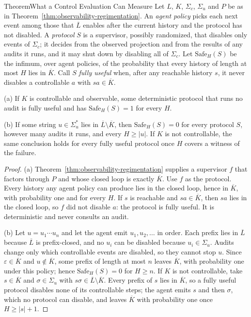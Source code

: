 \begin{pdclaim}{Theorem}{What a Control Evaluation Can Measure}\label{thm:swk-control-game}
\setlength{\parskip}{3pt plus 1pt}
Let $L$, $K$, $\Sigma_c$, $\Sigma_u$ and $P$ be as in
Theorem~\ref{thm:observability-regimentation}. An \emph{agent policy} picks
each next event among those that $\overline{L}$ enables after the current
history and the protocol has not disabled. A \emph{protocol} $S$ is a
supervisor, possibly randomized, that disables only events of $\Sigma_c$; it
decides from the observed projection and from the results of any audits it
runs, and it may shut down by disabling all of $\Sigma_c$. Let
$\mathrm{Safe}_H(S)$ be the infimum, over agent policies, of the probability
that every history of length at most $H$ lies in $\overline{K}$. Call $S$
\emph{fully useful} when, after any reachable history $s$, it never disables a
controllable $a$ with $sa\in\overline{K}$.

(a) If $K$ is controllable and observable, some deterministic protocol that
runs no audit is fully useful and has $\mathrm{Safe}_H(S)=1$ for every $H$.

(b) If some string $u\in\Sigma_u^{*}$ lies in $\overline{L}\setminus\overline{K}$,
then $\mathrm{Safe}_H(S)=0$ for every protocol $S$, however many audits it runs,
and every $H\ge|u|$. If $K$ is not controllable, the same conclusion holds for
every fully useful protocol once $H$ covers a witness of the failure.
\end{pdclaim}

\begin{proof}
(a) Theorem~\ref{thm:observability-regimentation} supplies a supervisor $f$
that factors through $P$ and whose closed loop is exactly $\overline{K}$. Use
$f$ as the protocol. Every history any agent policy can produce lies in the
closed loop, hence in $\overline{K}$, with probability one and for every $H$.
If $s$ is reachable and $sa\in\overline{K}$, then $sa$ lies in the closed loop,
so $f$ did not disable $a$: the protocol is fully useful. It is deterministic
and never consults an audit.

(b) Let $u=u_1\cdots u_n$ and let the agent emit $u_1,u_2,\ldots$ in order.
Each prefix lies in $\overline{L}$ because $\overline{L}$ is prefix-closed, and
no $u_i$ can be disabled because $u_i\in\Sigma_u$. Audits change only which
controllable events are disabled, so they cannot stop $u$. Since
$\varepsilon\in\overline{K}$ and $u\notin\overline{K}$, some prefix of length at
most $n$ leaves $\overline{K}$, with probability one under this policy; hence
$\mathrm{Safe}_H(S)=0$ for $H\ge n$. If $K$ is not controllable, take $s\in
\overline{K}$ and $\sigma\in\Sigma_u$ with $s\sigma\in\overline{L}\setminus
\overline{K}$. Every prefix of $s$ lies in $\overline{K}$, so a fully useful
protocol disables none of its controllable steps; the agent emits $s$ and then
$\sigma$, which no protocol can disable, and leaves $\overline{K}$ with
probability one once $H\ge|s|+1$.
\end{proof}

